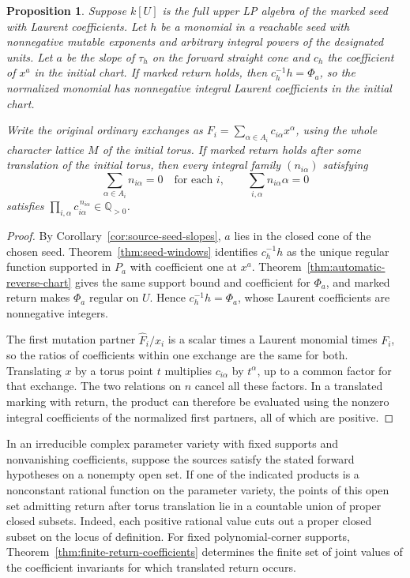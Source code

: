 \documentclass[11pt,reqno]{amsart}
\numberwithin{equation}{section}
\newtheorem{proposition}[theorem]{Proposition}
\theoremstyle{definition}
\theoremstyle{remark}
\begin{document}
\begin{proposition}\label{prop:arithmetic-marked-return}
Suppose \(k[U]\) is the full upper LP algebra of the marked seed with
Laurent coefficients. Let \(h\) be a monomial
in a reachable seed with nonnegative mutable exponents and arbitrary
integral powers of the designated units. Let \(a\) be the slope of
\(\tau_h\) on the forward straight cone and \(c_h\) the coefficient of
\(x^a\) in the initial chart. If marked return holds, then
\(c_h^{-1}h=\Phi_a\), so the normalized monomial has nonnegative
integral Laurent coefficients in the initial chart.

Write the original ordinary exchanges as
\(F_i=\sum_{\alpha\in A_i}c_{i\alpha}x^\alpha\), using the whole
character lattice \(M\) of the initial torus.
If marked return holds after some translation of the initial torus,
then every integral family \((n_{i\alpha})\) satisfying
\[ \sum_{\alpha\in A_i} n_{i\alpha}=0\quad\text{for each }i, \qquad \sum_{i,\alpha} n_{i\alpha}\alpha=0 \]
satisfies
\(\prod_{i,\alpha} c_{i\alpha}^{\,n_{i\alpha}} \in\mathbb Q_{>0}\).
\end{proposition}
\begin{proof}
By Corollary~\ref{cor:source-seed-slopes}, \(a\) lies in the closed
cone of the chosen seed. Theorem~\ref{thm:seed-windows} identifies
\(c_h^{-1}h\) as the unique regular function supported in \(P_a\) with
coefficient one at \(x^a\). Theorem~\ref{thm:automatic-reverse-chart}
gives the same support bound and coefficient for \(\Phi_a\), and marked
return makes \(\Phi_a\) regular on \(U\). Hence \(c_h^{-1}h=\Phi_a\),
whose Laurent coefficients are nonnegative integers.

The first mutation partner \(\widehat F_i/x_i\) is a scalar times a
Laurent monomial times \(F_i\), so the ratios of coefficients within
one exchange are the same for both. Translating \(x\) by a
torus point \(t\) multiplies \(c_{i\alpha}\) by \(t^\alpha\), up to
a common factor for that exchange. The two relations on \(n\) cancel
all these factors. In a translated marking with return, the product
can therefore be evaluated using the nonzero integral coefficients
of the normalized first partners, all of which are positive.
\end{proof}

In an irreducible complex parameter variety with fixed supports and
nonvanishing coefficients, suppose the sources satisfy the stated
forward hypotheses on a nonempty open set. If one of the indicated
products is a nonconstant rational function on the parameter variety,
the points of this open set admitting return after torus translation
lie in a countable union of proper closed subsets. Indeed, each
positive rational value cuts out a proper closed subset on the locus
of definition. For fixed polynomial-corner supports,
Theorem~\ref{thm:finite-return-coefficients} determines the finite
set of joint values of the coefficient invariants for which translated
return occurs.
\end{document}
